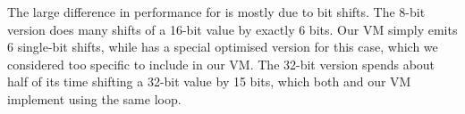 The large difference in performance for  is mostly due to bit shifts. The 8-bit version does many shifts of a 16-bit value by exactly 6 bits. Our VM simply emits 6 single-bit shifts, while  has a special optimised version for this case, which we considered too specific to include in our VM. The 32-bit version spends about half of its time shifting a 32-bit value by 15 bits, which both  and our VM implement using the same loop.


%
%
%
%


